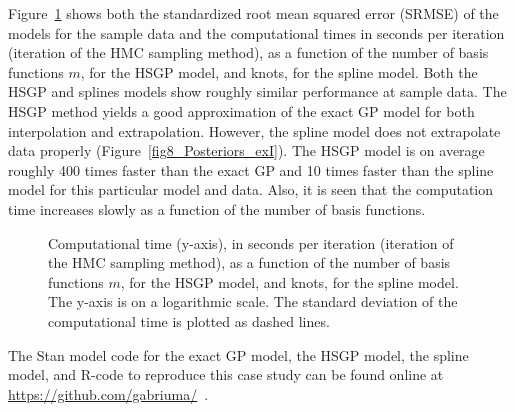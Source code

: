 Figure~\ref{fig9_rmse_time_exI} shows both the standardized root mean squared error (SRMSE) of the models for the sample data and the computational times in seconds per iteration (iteration of the HMC sampling method), as a function of the number of basis functions $m$, for the HSGP model, and knots, for the spline model. Both the HSGP and splines models show roughly similar performance at sample data. The HSGP method yields a good approximation of the exact GP model for both interpolation and extrapolation. However, the spline model does not extrapolate data properly (Figure~\ref{fig8_Posteriors_exI}). The HSGP model is on average roughly 400 times faster than the exact GP and 10 times faster than the spline model for this particular model and data. Also, it is seen that the computation time increases slowly as a function of the number of basis functions.

\begin{figure}[!h]
\centering
{}
\caption{Computational time (y-axis), in seconds per iteration (iteration of the HMC sampling method), as a function of the number of basis functions $m$, for the HSGP model, and knots, for the spline model. The y-axis is on a logarithmic scale. The standard deviation of the computational time is plotted as dashed lines.}
  \label{fig9_rmse_time_exI}
\end{figure}

The Stan model code for the exact GP model, the HSGP model, the spline model, and R-code to reproduce this case study can be found online at {\small \url{ https://github.com/gabriuma/}} \,.



